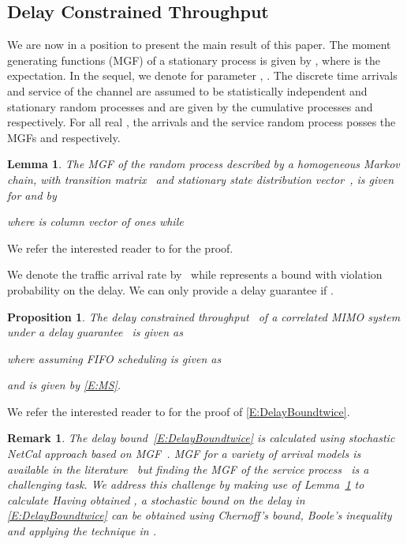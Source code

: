 \documentclass[10pt,conference]{IEEEtran}
\newtheorem{lemma}[theorem]{Lemma}
\newtheorem{proposition}[theorem]{Proposition}
\newtheorem{remark}{Remark}
\begin{document}
\subsection{Delay Constrained Throughput}
We are now in a position to present the main result of this paper.
The moment generating functions (MGF) of a stationary process  is given by , where  is the expectation.
In the sequel, we denote
 for parameter , .
The discrete time arrivals and service of the channel are assumed to be statistically independent and stationary random processes and are given by the cumulative processes  and  respectively.
For all real , the arrivals and the service random process posses the MGFs  and  respectively.
\begin{lemma}\label{Lema:MGF_s}
The MGF of the random process  described by a homogeneous Markov chain, with transition matrix~ and stationary state distribution vector~, is given for  and  by

where  is column vector of ones while

\end{lemma}
\begin{IEEEproof}
We refer the interested reader to \cite{NetCal:Chang00:PerGuaran:Bk} for the proof.
\end{IEEEproof}
We denote the traffic arrival rate by~ while  represents a bound with violation probability  on the delay.
We can only provide a delay guarantee  if .
\begin{proposition}
The delay constrained throughput~ of a correlated MIMO system under a delay guarantee~ is given as

where  assuming FIFO scheduling is given as

and  is given by \eqref{E:MS}.
\end{proposition}
\begin{IEEEproof}
We refer the interested reader to \cite{NetCal:Chang00:PerGuaran:Bk} for the proof of \eqref{E:DelayBoundtwice}.
\end{IEEEproof}
\begin{remark}
    \label{Rem:Dbound}
The delay bound~\eqref{E:DelayBoundtwice} is calculated using stochastic NetCal approach based on MGF~\cite{NetCal:Fidler2006:EoEProbabNetCalWithMGF}.
MGF for a variety of arrival models is available in the literature~\cite{NetCal:Chang00:PerGuaran:Bk} but finding the MGF of the service process~ is a challenging task.
We address this challenge by making use of Lemma~\ref{Lema:MGF_s} to calculate 
Having obtained , a stochastic bound on the delay  in \eqref{E:DelayBoundtwice} can be obtained using Chernoff's bound, Boole's inequality and applying the technique in \cite{NetCal:Fidler2006:EoEProbabNetCalWithMGF}.

\end{remark}
\end{document}
